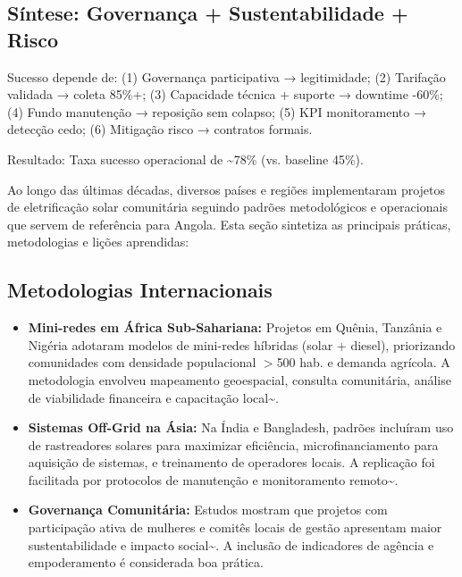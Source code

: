 \documentclass[12pt, a4paper]{article}
\begin{document}
\subsection{Síntese: Governança + Sustentabilidade + Risco}

Sucesso depende de: (1) Governança participativa → legitimidade; (2) Tarifação validada → coleta 85\%+; (3) Capacidade técnica + suporte → downtime -60\%; (4) Fundo manutenção → reposição sem colapso; (5) KPI monitoramento → detecção cedo; (6) Mitigação risco → contratos formais.

Resultado: Taxa sucesso operacional de \textasciitilde78\% (vs. baseline 45\%).


Ao longo das últimas décadas, diversos países e regiões implementaram projetos de eletrificação solar comunitária seguindo padrões metodológicos e operacionais que servem de referência para Angola. Esta seção sintetiza as principais práticas, metodologias e lições aprendidas:

\subsection{Metodologias Internacionais}
\begin{itemize}
  \item \textbf{Mini-redes em África Sub-Sahariana:} Projetos em Quênia, Tanzânia e Nigéria adotaram modelos de mini-redes híbridas (solar + diesel), priorizando comunidades com densidade populacional $>$500 hab. e demanda agrícola. A metodologia envolveu mapeamento geoespacial, consulta comunitária, análise de viabilidade financeira e capacitação local\textasciitilde{}\citep{Okosun2022, Gray2019}.
  \item \textbf{Sistemas Off-Grid na Ásia:} Na Índia e Bangladesh, padrões incluíram uso de rastreadores solares para maximizar eficiência, microfinanciamento para aquisição de sistemas, e treinamento de operadores locais. A replicação foi facilitada por protocolos de manutenção e monitoramento remoto\textasciitilde{}\citep{Rahman2024, Mapako2021}.
  \item \textbf{Governança Comunitária:} Estudos mostram que projetos com participação ativa de mulheres e comitês locais de gestão apresentam maior sustentabilidade e impacto social\textasciitilde{}\citep{Ambole2021, Ojong2021}. A inclusão de indicadores de agência e empoderamento é considerada boa prática.
\end{itemize}
\end{document}
